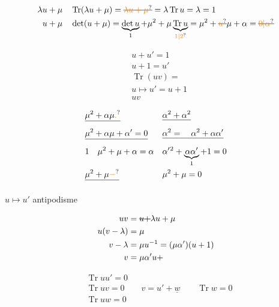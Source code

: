 

\[
\begin{aligned}
\lambda u+\mu\quad &\operatorname{Tr}(\lambda u+\mu)=\deleted{\unsure{\lambda u+\mu}}=\lambda\operatorname{Tr}u=\lambda=1\\
u+\mu\quad &\det(u+\mu)=\underbrace{\det u}_{1}+\mu^2+\mu\underbrace{\operatorname{Tr}u}_{\unsure{1|2}}
=\mu^2+\deleted{\unsure{u}}\mu+\alpha=\deleted{\unsure{0|\alpha}}
\end{aligned}
\]

\[
\begin{aligned}
&u+u'=1\\
&u+1=u'\\
&\operatorname{Tr}(uv)=\\
&u\longmapsto u'=u+1\\
&uv
\end{aligned}
\]

\[
\begin{aligned}
&\deleted{\mu^2+\alpha\mu\unsure{.}}&&\deleted{\alpha^2+\alpha^2}\\
&\deleted{\mu^2+\alpha\mu+\alpha'=0}&&\deleted{\alpha^2=\quad\alpha^2+\alpha\alpha'}\\
&1\quad\mu^2+\mu+\alpha=\alpha&&\alpha'{}^2+\underbrace{\alpha\alpha'}_{1}+1=0\\
&\deleted{\mu^2+\mu\unsure{-}}&&\mu^2+\mu=0
\end{aligned}
\]

$u\longmapsto u'$ antipodisme

\[
\begin{aligned}
uv&=\deleted{u+}\lambda u+\mu\\
u(v-\lambda)&=\mu\\
v-\lambda&=\mu u^{-1}=(\mu\alpha')(u+1)\\
v&=\mu\alpha'u+
\end{aligned}
\]

\[
\begin{aligned}
&\operatorname{Tr}uu'=0\\
&\operatorname{Tr}uv=0\qquad v=u'+\underline w\qquad \operatorname{Tr}w=0\\
&\operatorname{Tr}uw=0
\end{aligned}
\]

